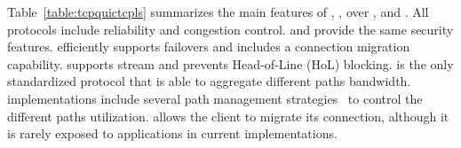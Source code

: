 Table~\ref{table:tcpquictcpls} summarizes the main features of \tcp, \mptcp,
\tls over \tcp, and \quic. All protocols include reliability and congestion
control. \tls and \quic provide the same security features. \mptcp efficiently
supports failovers and \quic includes a connection migration capability. \quic
supports stream and prevents Head-of-Line (HoL) blocking. \mptcp is the only
standardized protocol that is able to aggregate different paths bandwidth.
\mptcp implementations include several path management
strategies~\cite{hesmans2015smapp,hesmans2016enhanced} to control the different
paths utilization. \quic allows the client to migrate its connection, although
it is rarely exposed to applications in current implementations.













